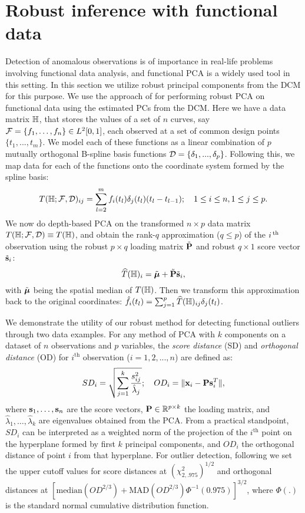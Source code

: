 \section{Robust inference with functional data}
\label{section:fpcaSection}
Detection of anomalous observations is of importance in real-life problems involving functional data analysis, and functional PCA is a widely used tool in this setting. In this section we utilize robust principal components from the DCM for this purpose. We use the approach of \cite{BoenteBarrera15} for performing robust PCA on functional data using the estimated PCs from the DCM. Here we have a data matrix ${\mathbb{H}}$, that stores the values of a set of $n$ curves, say $ \mathcal{F} = \{ f_1, \ldots , f_n  \} \in L^2[0,1]$, each observed at a set of common design points $\{ t_1, ..., t_m \} $. We model each of these functions as a linear combination of $p$ mutually orthogonal B-spline basis functions $\mathcal{D} = \{ \delta_1, ..., \delta_p \}$. Following this, we map data for each of the functions onto the coordinate system formed by the spline basis:
%
\begin{equation}
T( {\mathbb{H}}; \mathcal{F}, \mathcal{D})_{ij} = \sum_{l=2}^m f_i(t_l) \delta_j(t_l) (t_l - t_{l-1}); \quad 1 \leq i \leq n, 1 \leq j \leq p.
\end{equation}
%
We now do depth-based PCA on the transformed $n \times p$ data matrix $T({\mathbb{H}}; \mathcal{F}, \mathcal{D}) \equiv T({\mathbb{H}})$, and obtain the rank-$q$ approximation ($q \leq p$) of the $i\operatorname*{^{\text{th}}}$ observation using the robust $p \times q$ loading matrix $\tilde {{\mathbf{P}}}$ and robust $q \times 1$ score vector $\tilde{{\bf{s}}}_i$:
%
$$
\widehat T({\mathbb{H}})_i = \tilde {{\boldsymbol{\mu}}} + \tilde {{\mathbf{P}}} \tilde {{\bf{s}}}_i,
$$
%
with $\tilde {{\boldsymbol{\mu}}}$ being the spatial median of $T({\mathbb{H}})$. Then we transform this approximation back to the original coordinates: $\hat f_i (t_l) = \sum_{j=1}^p \widehat T({\mathbb{H}})_{ij} \delta_j (t_l)$.

We demonstrate the utility of our robust method for detecting functional outliers through two data examples. For any method of PCA with $k$ components on a dataset of $n$ observations and $p$ variables, the \textit{score distance} (SD) and \textit{orthogonal distance} (OD) for $i^\text{th}$ observation ($i=1,2,...,n$) are defined as:
%
$$
SD_i = \sqrt{ \sum_{j=1}^k \frac{s^2_{ij}}{\hat \lambda_j}}; \quad OD_i = \| {\bf{x}}_i - {\mathbf{P}}{\bf{s}}_i^T \|,
$$
%
where ${\bf{s}}_1, \ldots ,{\bf{s}}_n$ are the score vectors, ${\mathbf{P}} \in {\mathbb{R}}^{p\times k}$ the loading matrix, and $\hat \lambda_1,\ldots ,\hat \lambda_k$ are eigenvalues obtained from the PCA. From a practical standpoint, $SD_i$ can be interpreted as a weighted norm of the projection of the $i^\text{th}$ point on the hyperplane formed by first $k$ principal components, and $OD_i$ the orthogonal distance of point $i$ from that hyperplane. For outlier detection, following \cite{hubert05} we set the upper cutoff values for score distances at $(\chi^2_{2,.975})^{1/2}$ and orthogonal distances at $[\text{median}(OD^{2/3}) + \text{MAD}(OD^{2/3})\Phi^{-1}(0.975)]^{3/2}$, where $\Phi(.)$ is the standard normal cumulative distribution function.


